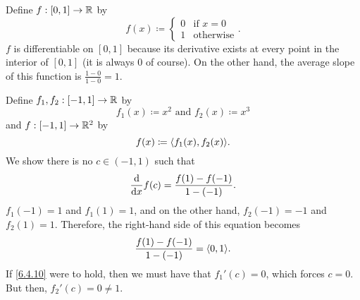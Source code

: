 \begin{exm}
Define $f:[0,1]\rightarrow \mathbb{R}$ by
\begin{equation}
f(x)\coloneqq \begin{cases}0 & \text{if }x=0 \\ 1 & \text{otherwise}\end{cases}.
\end{equation}
$f$ is differentiable on $[0,1]$ because its derivative exists at every point in the interior of $[0,1]$ (it is always $0$ of course).  On the other hand, the average slope of this function is $\frac{1-0}{1-0}=1$.
\end{exm}
\begin{exm}\label{exm6.4.8}
Define $f_1,f_2:[-1,1]\rightarrow \mathbb{R}$ by
\begin{equation}
f_1(x)\coloneqq x^2\text{ and }f_2(x)\coloneqq x^3
\end{equation}
and $f:[-1,1]\rightarrow \mathbb{R} ^2$ by
\begin{equation}
f(x)\coloneqq \langle f_1(x),f_2(x)\rangle.
\end{equation}
We show there is no $c\in (-1,1)$ such that
\begin{equation}\label{6.4.10}
\frac{\mathop{}\!\mathrm{d}}{\mathop{}\!\mathrm{d} x}f(c)=\frac{f(1)-f(-1)}{1-(-1)}.
\end{equation}
$f_1(-1)=1$ and $f_1(1)=1$, and on the other hand, $f_2(-1)=-1$ and $f_2(1)=1$.  Therefore, the right-hand side of this equation becomes
\begin{equation}
\frac{f(1)-f(-1)}{1-(-1)}=\langle0,1\rangle.
\end{equation}
If \eqref{6.4.10} were to hold, then we must have that $f_1'(c)=0$, which forces $c=0$.  But then, $f_2'(c)=0\neq 1$.
\end{exm}

